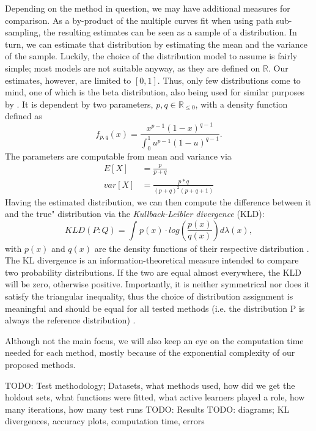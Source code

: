 Depending on the method in question, we may have additional measures for comparison. As a by-product of the multiple curves fit when using path sub-sampling, the resulting estimates can be seen as a sample of a distribution. In turn, we can estimate that distribution by estimating the mean and the variance of the sample. Luckily, the choice of the distribution model to assume is fairly simple; most models are not suitable anyway, as they are defined on $\mathbb{R}$. Our estimates, however, are limited to $[0,1]$. Thus, only few distributions come to mind, one of which is the beta distribution, also being used for similar purposes by \cite{KremplEtAl2014}. It is dependent by two parameters, $p, q \in \mathbb{R}_{\le 0}$, with a density function defined as \cite{GuptaEtAl2004}
\begin{equation}
f_{p, q}(x) = \frac{x^{p-1}(1-x)^{q-1}}{\int_{0}^{1} u^{p-1}(1-u)^{q-1}}.
\end{equation}
The parameters are computable from mean and variance via
\begin{equation}
\begin{split}
E[X] &= \frac{p}{p+q} \\
var[X] &= \frac{p*q}{(p+q)^2(p+q+1)}
\end{split}
\end{equation}
Having the estimated distribution, we can then compute the difference between it and the true" distribution via the \textit{Kullback-Leibler divergence} (KLD):
\begin{equation}
KLD(P:Q) = \int_{}^{} p(x) \cdot log\left(\frac{p(x)}{q(x)}\right) d\lambda (x),
\end{equation}
with $p(x)$ and $q(x)$ are the density functions of their respective distribution \cite{KullbackEtAl1951}. The KL divergence is an information-theoretical measure intended to compare two probability distributions. If the two are equal almost everywhere, the KLD will be zero, otherwise positive. Importantly, it is neither symmetrical nor does it satisfy the triangular inequality, thus the choice of distribution assignment is meaningful and should be equal for all tested methods (i.e. the distribution P is always the reference distribution) \cite{Joyce2011}.

Although not the main focus, we will also keep an eye on the computation time needed for each method, mostly because of the exponential complexity of our proposed methods.


TODO: Test methodology; Datasets, what methods used, how did we get the holdout sets, what functions were fitted, what active learners played a role, how many iterations, how many test runs
TODO: Results
TODO: diagrams; KL divergences, accuracy plots, computation time, errors



